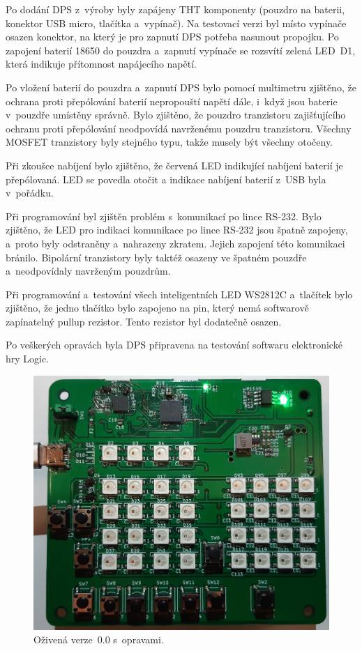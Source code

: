   Po dodání DPS z~výroby byly zapájeny THT komponenty (pouzdro na baterii, konektor USB micro, tlačítka a~vypínač). Na testovací verzi
  byl místo vypínače osazen konektor, na který je pro zapnutí DPS potřeba nasunout propojku. Po zapojení baterií
  18650 do pouzdra a~zapnutí vypínače se rozsvítí zelená LED~D1, která indikuje přítomnost napájecího napětí. 

  Po vložení baterií do pouzdra a~zapnutí DPS bylo pomocí multimetru zjištěno, že ochrana proti přepólování baterií nepropouští napětí 
  dále, i~když jsou baterie v~pouzdře umístěny správně. Bylo zjištěno, že pouzdro tranzistoru zajišťujícího ochranu proti přepólování 
  neodpovídá navrženému pouzdru tranzistoru. Všechny MOSFET tranzistory byly stejného typu, takže musely být všechny otočeny.
  
  Při zkoušce nabíjení bylo zjištěno, že červená LED indikující nabíjení baterií je přepólovaná. LED se povedla otočit a indikace nabíjení 
  baterií z~USB byla v~pořádku. 
  
  Při programování byl zjištěn problém s~komunikací po lince RS-232. Bylo zjištěno, že LED pro indikaci komunikace po lince RS-232 jsou 
  špatně zapojeny, a~proto byly odstraněny a~nahrazeny zkratem. Jejich zapojení této komunikaci bránilo. Bipolární tranzistory byly 
  taktéž osazeny ve špatném pouzdře a~neodpovídaly navrženým pouzdrům. 
  
  Při programování a~testování všech inteligentních LED WS2812C a~tlačítek bylo zjištěno, že jedno tlačítko bylo zapojeno na pin, který 
  nemá softwarově zapínatelný pullup rezistor. Tento rezistor byl dodatečně osazen.
  
  Po veškerých opravách byla DPS připravena na testování softwaru elektronické hry Logic.

  \begin{figure}[!h]
    \begin{center}
      \includegraphics[scale=0.1]{obrazky/Verze0_zapnuto_nabito.jpg}
    \end{center}
    \caption[Oživená verze~0.0 s~opravami]{Oživená verze~0.0 s~opravami.}
  \end{figure}

